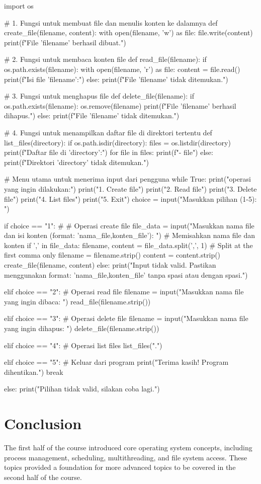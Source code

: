 \documentclass[12pt]{article}
\begin{document}
\begin{python}
    import os

# 1. Fungsi untuk membuat file dan menulis konten ke dalamnya
def create_file(filename, content):
    with open(filename, 'w') as file:
        file.write(content)
    print(f"File '{filename}' berhasil dibuat.")

# 2. Fungsi untuk membaca konten file
def read_file(filename):
    if os.path.exists(filename):
        with open(filename, 'r') as file:
            content = file.read()
            print(f"Isi file '{filename}':")
    else:
        print(f"File '{filename}' tidak ditemukan.")

# 3. Fungsi untuk menghapus file
def delete_file(filename):
    if os.path.exists(filename):
        os.remove(filename)
        print(f"File '{filename}' berhasil dihapus.")
    else:
        print(f"File '{filename}' tidak ditemukan.")

# 4. Fungsi untuk menampilkan daftar file di direktori tertentu
def list_files(directory):
    if os.path.isdir(directory):
        files = os.listdir(directory)
        print(f"Daftar file di '{directory}':")
        for file in files:
            print(f"- {file}")
    else:
        print(f"Direktori '{directory}' tidak ditemukan.")

# Menu utama untuk menerima input dari pengguna
while True:
    print("\nPilih operasi yang ingin dilakukan:")
    print("1. Create file")
    print("2. Read file")
    print("3. Delete file")
    print("4. List files")
    print("5. Exit")
    choice = input("Masukkan pilihan (1-5): ")

    if choice == "1":
    #     # Operasi create file
        file_data = input("Masukkan nama file dan isi konten (format: 'nama_file,konten_file'): ")
         # Memisahkan nama file dan konten
        if ',' in file_data:
            filename, content = file_data.split(',', 1)  # Split at the first comma only
            filename = filename.strip()
            content = content.strip()
            create_file(filename, content)
        else:
            print("Input tidak valid. Pastikan menggunakan format: 'nama_file,konten_file' tanpa spasi atau dengan spasi.")
        
    elif choice == "2":
        # Operasi read file
        filename = input("Masukkan nama file yang ingin dibaca: ")
        read_file(filename.strip())
        
    elif choice == "3":
        # Operasi delete file
        filename = input("Masukkan nama file yang ingin dihapus: ")
        delete_file(filename.strip())
        
    elif choice == "4":
        # Operasi list files
        list_files(".")
        
    elif choice == "5":
        # Keluar dari program
        print("Terima kasih! Program dihentikan.")
        break
        
    else:
        print("Pilihan tidak valid, silakan coba lagi.")
\end{python}

\section{Conclusion}
The first half of the course introduced core operating system concepts, including process management, scheduling, multithreading, and file system access. These topics provided a foundation for more advanced topics to be covered in the second half of the course.
\end{document}
